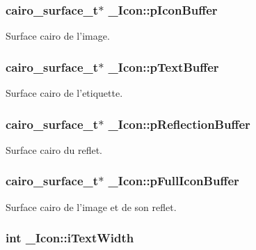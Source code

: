 \subsubsection{\setlength{\rightskip}{0pt plus 5cm}cairo\_\-surface\_\-t$\ast$ {\bf \_\-Icon::pIconBuffer}}\label{struct__Icon_eabd5f48e2453ec0eb2f7bb223a9873b}


Surface cairo de l'image. 

\subsubsection{\setlength{\rightskip}{0pt plus 5cm}cairo\_\-surface\_\-t$\ast$ {\bf \_\-Icon::pTextBuffer}}\label{struct__Icon_750cbf0bef73d6170c261cb7fd0b52d7}


Surface cairo de l'etiquette. 

\subsubsection{\setlength{\rightskip}{0pt plus 5cm}cairo\_\-surface\_\-t$\ast$ {\bf \_\-Icon::pReflectionBuffer}}\label{struct__Icon_50875c55a277b82454943fafc462a299}


Surface cairo du reflet. 

\subsubsection{\setlength{\rightskip}{0pt plus 5cm}cairo\_\-surface\_\-t$\ast$ {\bf \_\-Icon::pFullIconBuffer}}\label{struct__Icon_4e57fdf58863fa55440149a73907edca}


Surface cairo de l'image et de son reflet. 

\subsubsection{\setlength{\rightskip}{0pt plus 5cm}int {\bf \_\-Icon::iTextWidth}}\label{struct__Icon_9711919e518a35cb4409033221db63a9}


